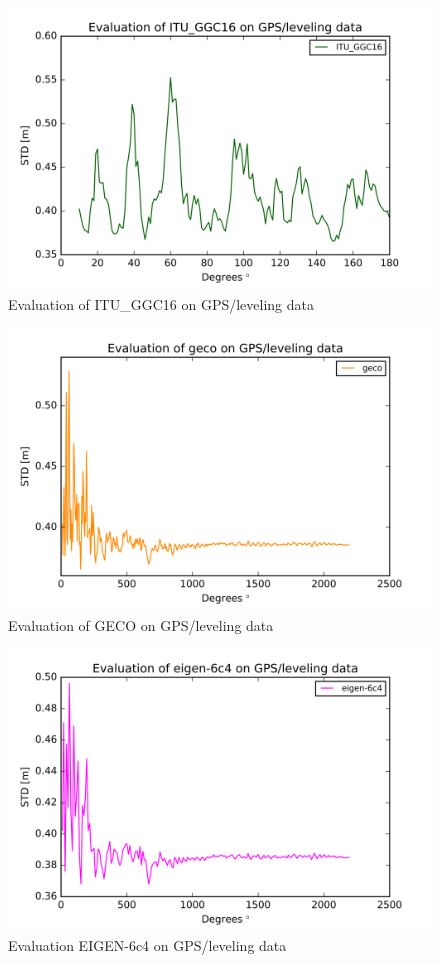         
        \begin{figure}[t]
        	\caption{Evaluation of ITU\_GGC16 on GPS/leveling data}
        	\label{sudan_data}
        	\includegraphics{Figures/ITU_GGC16_gps_figure.png}
        	\centering
        \end{figure}
        
        
        \begin{figure}[t]
        	\caption{Evaluation of GECO on GPS/leveling data}
        	\label{sudan_data}
        	\includegraphics{Figures/geco_gps_figure.png}
        	\centering
        \end{figure}
        
        \begin{figure}[t]
        	\caption{Evaluation EIGEN-6c4 on GPS/leveling data}
        	\label{sudan_data}
        	\includegraphics{Figures/eigen-6c4_gps_figure.png}
        	\centering
        \end{figure}